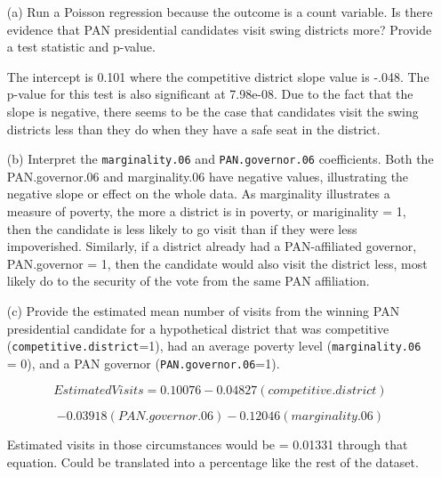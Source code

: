 \documentclass[12pt,letterpaper]{article}
\begin{document}
\begin{enumerate}
	\item [(a)]
	Run a Poisson regression because the outcome is a count variable. Is there evidence that PAN presidential candidates visit swing districts more? Provide a test statistic and p-value.
	\newpage
	
\vspace{.5cm}
  
\vspace{.5cm}
The intercept is 0.101 where the competitive district slope value is -.048. The p-value for this test is also significant at 7.98e-08. Due to the fact that the slope is negative, there seems to be the case that candidates visit the swing districts less than they do when they have a safe seat in the district.

	\item [(b)]
	Interpret the \texttt{marginality.06} and \texttt{PAN.governor.06} coefficients.
Both the PAN.governor.06 and marginality.06 have negative values, illustrating the negative slope or effect on the whole data. As marginality illustrates a measure of poverty, the more a district is in poverty, or mariginality = 1, then the candidate is less likely to go visit than if they were less impoverished. Similarly, if a district already had a PAN-affiliated governor, PAN.governor = 1, then the candidate would also visit the district less, most likely do to the security of the vote from the same PAN affiliation. 	
	
	
	\item [(c)]
	Provide the estimated mean number of visits from the winning PAN presidential candidate for a hypothetical district that was competitive (\texttt{competitive.district}=1), had an average poverty level (\texttt{marginality.06} = 0), and a PAN governor (\texttt{PAN.governor.06}=1).


\begin{equation}
Estimated Visits = 0.10076 - 0.04827(competitive.district)
\end{equation}

\begin{equation}
- 0.03918(PAN.governor.06) - 0.12046(marginality.06)
\end{equation}

Estimated visits in those circumstances would be = 	0.01331 through that equation. Could be translated into a percentage like the rest of the dataset. 


\end{enumerate}
	
\end{document}
